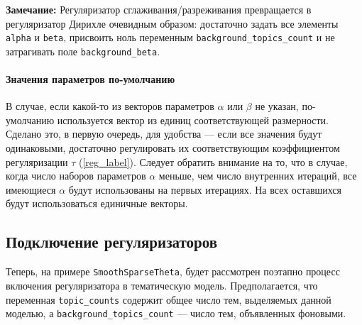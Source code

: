 {\bf Замечание:} Регуляризатор сглаживания/разреживания превращается в регуляризатор Дирихле очевидным образом: достаточно задать все элементы \verb|alpha| и \verb|beta|, присвоить ноль переменным \verb|background_topics_count| и не затрагивать поле \verb|background_beta|.

\paragraph{Значения параметров по-умолчанию}\label{note}
 В случае, если какой-то из векторов параметров $\alpha$ или $\beta$ не указан, по-умолчанию используется вектор из единиц соответствующей размерности. Сделано это, в первую очередь, для удобства --- если все значения будут одинаковыми, достаточно регулировать их соответствующим коэффициентом регуляризации $\tau$ (\ref{reg_label}). Следует обратить внимание на то, что в случае, когда число наборов параметров $\alpha$ меньше, чем число внутренних итераций, все имеющиеся $\alpha$ будут использованы на первых итерациях. На всех оставшихся будут использоваться единичные векторы.

\subsection{Подключение регуляризаторов}

Теперь, на примере \verb|SmoothSparseTheta|, будет рассмотрен поэтапно процесс включения регуляризатора в тематическую модель. Предполагается, что переменная \verb|topic_counts| содержит общее число тем, выделяемых данной моделью, а \verb|background_topics_count| --- число тем, объявленных фоновыми.

